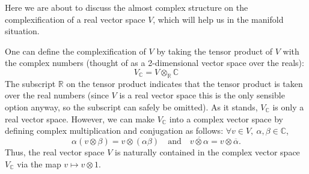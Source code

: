 \documentclass{ctexart}
\begin{document}
Here we are about to discuss the almost complex structure on the complexification of a real vector space $V$, which will help us in the manifold situation. 

One can define the complexification of $V$ by taking the tensor product of $V$ with the complex numbers (thought of as a 2-dimensional vector space over the reals):
$$
V_{\mathbb{C}}=V \otimes_{\mathbb{R}} \mathbb{C}
$$
The subscript $\mathbb{R}$ on the tensor product indicates that the tensor product is taken over the real numbers (since $V$ is a real vector space this is the only sensible option anyway, 
so the subscript can safely be omitted). As it stands, $V_{\mathbb{C}}$ is only a real vector space. However, we can make $V_{\mathbb{C}}$ into a complex vector space 
by defining complex multiplication and conjugation as follows: $\forall v \in V ,\ \alpha, \beta \in \mathbb{C}$, 
$$
\alpha(v \otimes \beta)=v \otimes(\alpha \beta)\quad\text{and}\quad  \overline{v \otimes \alpha}=v \otimes \overline{\alpha}. 
$$
Thus, the real vector space $V$ is naturally contained in the complex vector space $V_{\mathbb{C}}$ via the map $v \mapsto v \otimes 1$. 
\end{document}
